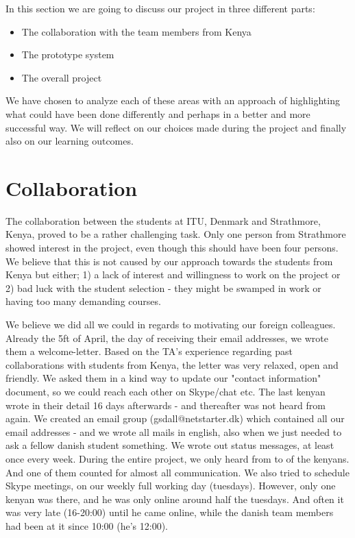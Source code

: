 In this section we are going to discuss our project in three different parts:

\begin{itemize}
	\item The collaboration with the team members from Kenya
	\item The prototype system
	\item The overall project
\end{itemize}

We have chosen to analyze each of these areas with an approach of highlighting what could have been done differently and perhaps in a better and more successful way. We will reflect on our choices made during the project and finally also on our learning outcomes.

\section{Collaboration}\label{sec:discussioncollaboration}
The collaboration between the students at ITU, Denmark and Strathmore, Kenya, proved to be a rather challenging task. Only one person from Strathmore showed interest in the project, even though this should have been four persons. We believe that this is not caused by our approach towards the students from Kenya but either; 1) a lack of interest and willingness to work on the project or 2) bad luck with the student selection - they might be swamped in work or having too many demanding courses.

We believe we did all we could in regards to motivating our foreign colleagues. Already the 5ft of April, the day of receiving their email addresses, we wrote them a welcome-letter. Based on the TA's experience regarding past collaborations with students from Kenya, the letter was very relaxed, open and friendly. We asked them in a kind way to update our "contact information" document, so we could reach each other on Skype/chat etc. The last kenyan wrote in their detail 16 days afterwards - and thereafter was not heard from again. We created an email group (gsdall@netstarter.dk) which contained all our email addresses - and we wrote all mails in english, also when we just needed to ask a fellow danish student something. We wrote out status messages, at least once every week. During the entire project, we only heard from to of the kenyans. And one of them counted for almost all communication. We also tried to schedule Skype meetings, on our weekly full working day (tuesdays). However, only one kenyan was there, and he was only online around half the tuesdays. And often it was very late (16-20:00) until he came online, while the danish team members had been at it since 10:00 (he's 12:00).

